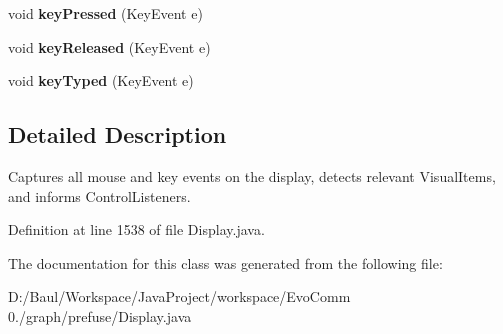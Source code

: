 \begin{DoxyCompactItemize}
\item 
\hypertarget{classprefuse_1_1_display_1_1_input_event_capturer_a4352a6509e1233c1cf9c747c6fdf713c}{void {\bfseries key\-Pressed} (\-Key\-Event e)}\label{classprefuse_1_1_display_1_1_input_event_capturer_a4352a6509e1233c1cf9c747c6fdf713c}

\item 
\hypertarget{classprefuse_1_1_display_1_1_input_event_capturer_a09372f5a21e664a4067a317a8f44e9a5}{void {\bfseries key\-Released} (\-Key\-Event e)}\label{classprefuse_1_1_display_1_1_input_event_capturer_a09372f5a21e664a4067a317a8f44e9a5}

\item 
\hypertarget{classprefuse_1_1_display_1_1_input_event_capturer_a927bdb8337d09028f96d2fd406cead49}{void {\bfseries key\-Typed} (\-Key\-Event e)}\label{classprefuse_1_1_display_1_1_input_event_capturer_a927bdb8337d09028f96d2fd406cead49}

\end{DoxyCompactItemize}


\subsection{\-Detailed \-Description}
\-Captures all mouse and key events on the display, detects relevant \-Visual\-Items, and informs \-Control\-Listeners. 

\-Definition at line 1538 of file \-Display.\-java.



\-The documentation for this class was generated from the following file\-:\begin{DoxyCompactItemize}
\item 
\-D\-:/\-Baul/\-Workspace/\-Java\-Project/workspace/\-Evo\-Comm 0./graph/prefuse/\-Display.\-java\end{DoxyCompactItemize}
